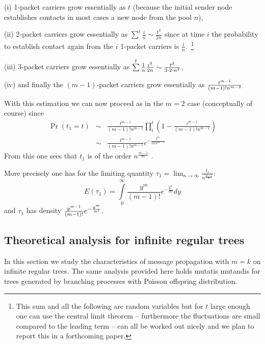 (i) 1-packet carriers grow essentially as $t$ (because the initial sender
node establishes contacts in most cases a new node from the pool $n$),

(ii) 2-packet carriers grow essentially as $\sum\limits^{t}\frac{i}{n}\sim 
\frac{t^{2}}{2n}$ since at time $i$ the probability to establish contact
again from the $i$ 1-packet carriers is $\frac{i}{n}.$~\footnote{%
This sum and all the following are random variables but for $t$ large enough
one can use the central limit theorem -- furthermore the fluctuations are
small compared to the leading term -- can all be worked out nicely and we
plan to report this in a forthcoming paper.}

(iii) 3-packet carriers grow essentially as $\sum\limits^{t}\frac{1}{n}\frac{%
i^{2}}{2n}\sim \frac{t^{3}}{3\cdot 2\cdot n^{2}}$,

\bigskip

(iv) and finally the $(m-1)$-packet carriers grow essentially as $\frac{%
t^{m-1}}{\left( m-1\right) !n^{m-2}}$

With this estimation we can now proceed as in the $m=2$ case (conceptually
of course) since%
\begin{eqnarray*}
\Pr \left( t_{1}=t\right) &\sim &\frac{t^{m-1}}{\left( m-1\right) !n^{m-1}}%
\prod\limits_{i}^{t}\left( 1-\frac{i^{m-1}}{\left( m-1\right) !n^{m-1}}%
\right) \\
&\sim &\frac{t^{m-1}}{\left( m-1\right) !n^{m-1}}e^{-\frac{t^{m}}{m!n^{m-1}}}
\end{eqnarray*}%
From this one sees that $t_{1}$ is of the order $n^{\frac{m-1}{m}}$ .

More precisely one has for the limiting quantity $\tau
_{1}=\lim_{n\rightarrow \infty }\frac{t_{1}}{n^{\frac{m-1}{m}}}:$%
\[
E\left( \tau _{1}\right) =\int\limits_{0}^{\infty }\frac{y^{m}}{\left(
m-1\right) !}e^{-\frac{y^{m}}{m!}}dy 
\]%
and $\tau _{1}$ has density $\frac{y^{m-1}}{\left( m-1\right) !}e^{-\frac{%
y^{m}}{m!}}.$

\subsection{Theoretical analysis for infinite regular trees}   
In this section we study the characteristics of message propagation with $m=k$ on
infinite regular trees. The same analysis provided here holds mutatis
mutandis for trees generated by branching processes with Poisson offspring
distribution.

